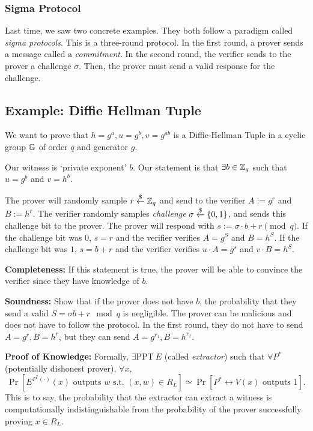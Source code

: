 \subsubsection{Sigma Protocol}

Last time, we saw two concrete examples. They both follow a paradigm called \textit{sigma protocols}. This is a three-round protocol. In the first round, a prover sends a message called a \textit{commitment}. In the second round, the verifier sends to the prover a challenge $\sigma$. Then, the prover must send a valid response for the challenge.

\subsection{Example: Diffie Hellman Tuple}

We want to prove that $h = g^a, u = g^b, v = g^{ab}$ is a Diffie-Hellman Tuple in a cyclic group $\mathbb G$ of order $q$ and generator $g$.

Our witness is `private exponent' $b$. Our statement is that $\exists b\in \mathbb Z_q$ such that $u = g^b$ and $v = h^b$.


The prover will randomly sample $r\overset{\$}{\leftarrow} \mathbb Z_q$ and send to the verifier $A:=g^r$ and $B:=h^r$. The verifier randomly samples \emph{challenge} $\sigma \overset{\$}{\leftarrow} \{0, 1\}$, and sends this challenge bit to the prover. The prover will respond with $s := \sigma\cdot b + r\pmod{q}$. If the challenge bit was $0$, $s = r$ and the verifier verifies $A = g^S$ and $B = h^S$. If the challenge bit was $1$, $s = b + r$ and the verifier verifies $u\cdot A = g^s$ and $v\cdot B = h^S$.

\textbf{Completeness:} If this statement is true, the prover will be able to convince the verifier since they have knowledge of $b$.

\textbf{Soundness:} Show that if the prover does not have $b$, the probability that they send a valid $S = \sigma b + r \mod q$ is negligible. The prover can be malicious and does not have to follow the protocol. In the first round, they do not have to send $A = g^r, B = h^r$, but they can send $A = g^{r_1}, B= h^{r_2}$.

\textbf{Proof of Knowledge:} Formally, $\exists \mathrm{PPT}\ E$ (called \emph{extractor}) such that $\forall P^*$ (potentially dishonest prover), $\forall x$,
\[\Pr[E^{P^*(\cdot)}(x) \text{ outputs }w\text{ s.t. }(x, w)\in R_L] \simeq \Pr[P^*\leftrightarrow V(x)\text{ outputs }1].\]
This is to say, the probability that the extractor can extract a witness is computationally indistinguishable from the probability of the prover successfully proving $x\in R_L$.

